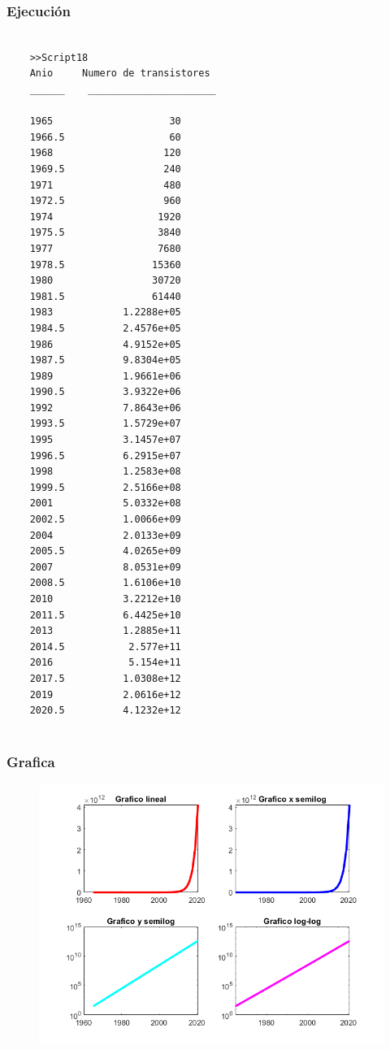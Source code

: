 \documentclass{article}
\begin{document}
	\newpage
	
	\subsubsection{Ejecución}
	
	\begin{lstlisting}
	
	>>Script18
	Anio     Numero de transistores
	______    ______________________
	
	1965                  	30    
	1966.5                  60      
	1968               	   120      
	1969.5             	   240      
	1971               	   480      
	1972.5                 960      
	1974                  1920      
	1975.5                3840      
	1977                  7680      
	1978.5               15360      
	1980                 30720      
	1981.5               61440      
	1983            1.2288e+05      
	1984.5          2.4576e+05      
	1986            4.9152e+05      
	1987.5          9.8304e+05      
	1989            1.9661e+06      
	1990.5          3.9322e+06      
	1992            7.8643e+06      
	1993.5          1.5729e+07      
	1995            3.1457e+07      
	1996.5          6.2915e+07      
	1998            1.2583e+08      
	1999.5          2.5166e+08      
	2001            5.0332e+08      
	2002.5          1.0066e+09      
	2004            2.0133e+09      
	2005.5          4.0265e+09      
	2007            8.0531e+09      
	2008.5          1.6106e+10      
	2010            3.2212e+10      
	2011.5          6.4425e+10      
	2013            1.2885e+11      
	2014.5           2.577e+11      
	2016             5.154e+11      
	2017.5          1.0308e+12      
	2019            2.0616e+12      
	2020.5          4.1232e+12      
	
	\end{lstlisting}
	
	\newpage
	
	\subsubsection{Grafica}
	
	\begin{figure}[h]
		\centering
		\includegraphics[width=\textwidth]{grafica18.png}
	\end{figure}
	
\end{document}
